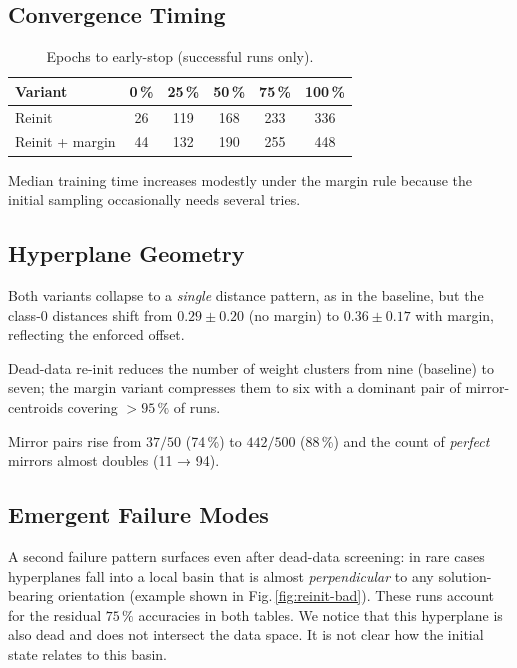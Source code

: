 \subsection*{Convergence Timing}

\begin{table}[h]
\centering
\caption{Epochs to early-stop (successful runs only).}
\label{tab:relu1-reinit-epochs}
\begin{tabular}{lccccc}
\toprule
Variant & 0\,\% & 25\,\% & 50\,\% & 75\,\% & 100\,\% \\
\midrule
Reinit            & 26 & 119 & 168 & 233 & 336 \\
Reinit + margin   & 44 & 132 & 190 & 255 & 448 \\
\bottomrule
\end{tabular}
\end{table}

Median training time increases modestly under the margin rule because
the initial sampling occasionally needs several tries.

\subsection*{Hyperplane Geometry}

\begin{description}[leftmargin=2em]
  \item[Distance clusters] Both variants collapse to a \emph{single}
        distance pattern, as in the baseline, but the class-0 distances
        shift from \(0.29\pm0.20\) (no margin) to
        \(0.36\pm0.17\) with margin, reflecting the enforced offset.%
        
  \item[Weight clusters] Dead-data re-init reduces the number of weight
        clusters from nine (baseline) to seven; the margin variant
        compresses them to six with a dominant pair of mirror-centroids
        covering $>95\,\%$ of runs.%
  \item[Mirror symmetry] Mirror pairs rise from
        $37/50$ (74\,\%) to $442/500$ (88\,\%) and the count of
        \emph{perfect} mirrors almost doubles
        (11 → 94).%
\end{description}

\subsection*{Emergent Failure Modes}
A second failure pattern surfaces even after dead-data screening:
in rare cases hyperplanes fall into a local basin that is almost
\emph{perpendicular} to any solution-bearing orientation (example shown in Fig.\,\ref{fig:reinit-bad}).
These runs account for the residual $75\,\%$ accuracies in both tables. 
We notice that this hyperplane is also dead and does not intersect the data space.
It is not clear how the initial state relates to this basin.

